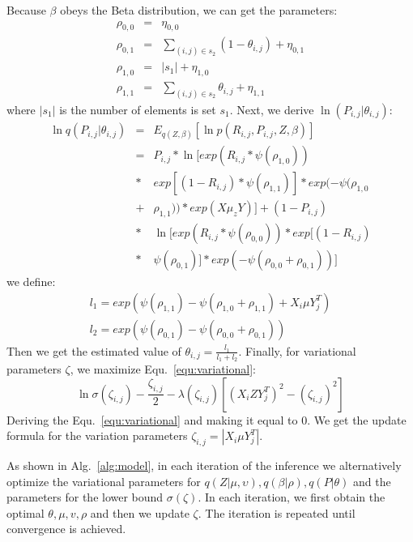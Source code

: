 \documentclass[conference]{IEEEtran}
\begin{document}
Because $\beta$ obeys the Beta distribution, we can get the parameters: 
\begin{eqnarray*}
\rho_{0,0} &=& \eta_{0,0}\\
\rho_{0,1} &=& \sum_{(i,j)\in s_2}(1-\theta_{i,j})+\eta_{0,1}\\
\rho_{1,0} &=& \left|s_1\right| +\eta_{1,0}\\
\rho_{1,1} &=& \sum_{(i,j)\in s_2}\theta_{i,j}+\eta_{1,1}
\end{eqnarray*}
where $\left|s_1\right|$ is the number of elements is set $s_1$. Next, we derive $\ln(P_{i,j}|\theta_{i,j})$:
\begin{eqnarray*}
\ln q(P_{i,j}|\theta_{i,j}) &=& E_{q(Z,\beta)}[\ln p(R_{i,j},P_{i,j},Z,\beta)] \\
&=& P_{i,j}*\ln[exp(R_{i,j}*\psi(\rho_{1,0}))\\
&*&exp[(1-R_{i,j})*\psi(\rho_{1,1})]*exp(-\psi(\rho_{1,0}\\
&+&\rho_{1,1}))*exp(X\mu_{z}Y)]+(1-P_{i,j}) \\
&*&\ln[exp(R_{i,j}*\psi(\rho_{0,0}))*exp[(1-R_{i,j})\\
&*&\psi(\rho_{0,1})]*exp(-\psi(\rho_{0,0}+\rho_{0,1}))]
\end{eqnarray*}
we define:
\begin{eqnarray*}
l_1 = exp(\psi(\rho_{1,1})-\psi(\rho_{1,0}+\rho_{1,1})+X_{i}\mu Y_{j}^{T})\\
l_2 = exp(\psi(\rho_{0,1})-\psi(\rho_{0,0}+\rho_{0,1}))
\end{eqnarray*}
Then we get the estimated value of $\theta_{i,j}=\frac{l_1}{l_1+l_2}$.
Finally, for variational parameters $\zeta$, we maximize Equ.~\ref{equ:variational}:
\begin{equation}\label{equ:variational}
    \ln{\sigma(\zeta_{i,j})}-\frac{\zeta_{i,j}}{2}-\lambda(\zeta_{i,j})[(X_{i}ZY_{j}^{T})^2-(\zeta_{i,j})^2]
\end{equation}
Deriving the Equ.~\ref{equ:variational} and making it equal to $0$. We get the update formula for the variation parameters $\zeta_{i,j} = \left|X_{i}\mu Y_{j}^T\right|$.

As shown in Alg.~\ref{alg:model}, in each iteration of the inference we alternatively optimize the variational parameters for $q(Z|\mu,\upsilon),q(\beta|\rho), q(P|\theta)$ and the parameters for the lower bound $\sigma(\zeta)$.  In each iteration, we first obtain the optimal $\theta,\mu,v,\rho$ and then we update $\zeta$. The iteration is repeated until convergence is achieved.
\end{document}
